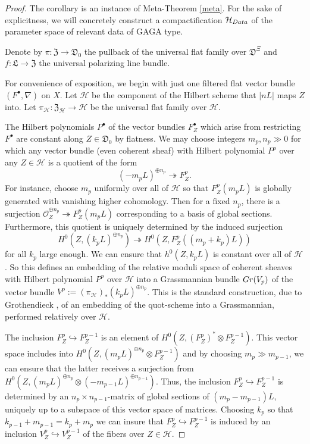 \documentclass[10pt,letterpaper,english,reqno]{amsart}
\numberwithin{equation}{subsection}
\newcommand\cH{{\mathcal H}}
\newcommand\cO{{\mathcal O}}
\newcommand\fD{{\mathfrak D}}
\newcommand\fL{{\mathfrak L}}
\newcommand\fZ{{\mathfrak Z}}
\newcommand\onto{\twoheadrightarrow}
\newcommand\into{\hookrightarrow}
\theoremstyle{definition}
\begin{document}
\begin{proof}
The corollary is an instance
of Meta-Theorem \ref{meta}.
For the sake of explicitness, we will
concretely construct a compactification
$\cH_{\rm Data}$ of the parameter space
of relevant data of GAGA type.

Denote by $\pi:\fZ\rightarrow \fD_0$ 
the pullback of the universal flat 
family over $\fD^\Xi$ and 
$f:\fL\rightarrow \fZ$ the universal 
polarizing line bundle.  

For convenience of exposition,
we begin with just one filtered flat vector bundle
$(F^\bullet, \nabla)$ on $X$.
Let $\cH$ be the component of the Hilbert scheme that
$|nL|$ maps $Z$ into. Let 
$\pi_\cH\colon \fZ_\cH\to \cH$ be the universal
flat family over $\cH$.

The Hilbert polynomials
$P^\bullet$ of the vector bundles $F^\bullet_Z$
which arise from restricting $F^\bullet$ 
are constant along $Z\in \fD_0$ by flatness. 
We may choose
integers $m_p, n_p \gg 0$ for which any vector
bundle (even coherent sheaf)
with Hilbert polynomial $P^p$ over 
any $Z\in \cH$
is a quotient of the form $$(-m_pL)^{\oplus n_p}\onto F^p_Z.$$
For instance, choose $m_p$
uniformly over all of $\cH$ so that $F_Z^p(m_pL)$
is globally generated with vanishing higher cohomology.
Then for a fixed $n_p$, there is a surjection
$\cO_Z^{\oplus n_p}\onto F^p_Z(m_pL)$ 
corresponding to a basis of global sections.
Furthermore, this quotient is uniquely determined by the
induced surjection  $$H^0(Z, (k_pL)^{\oplus n_p})\onto 
H^0(Z, F_Z^p((m_p+k_p)L))$$ for all $k_p$ large enough.
We can ensure that $h^0(Z,k_pL)$ is constant over all of $\cH$.
So this defines an embedding of the relative moduli
space of coherent sheaves with Hilbert polynomial $P^p$ over $\cH$
into a Grassmannian bundle ${\rm Gr}(V_p)$ of the vector bundle
$V^p:=(\pi_\cH)_*(k_pL)^{\oplus n_p}$. This is the standard 
construction, due to Grothendieck \cite{grothendieck-fga-iv}, 
of an embedding of the quot-scheme into a Grassmannian,
performed relatively over $\cH$.

The inclusion $F^p_Z\hookrightarrow F^{p-1}_Z$ is an element of
$H^0(Z, (F_Z^p)^*\otimes F_Z^{p-1})$. This vector space
includes into $H^0(Z, (m_pL)^{\oplus n_p}\otimes F_Z^{p-1})$
and by choosing $m_p\gg m_{p-1}$, we can ensure that the latter
receives a surjection from $H^0(Z,(m_pL)^{\oplus n_p}\otimes (-m_{p-1}L)^{\oplus n_{p-1}}).$ Thus, the inclusion $F_Z^p\hookrightarrow F_Z^{p-1}$
is determined by an $n_p\times n_{p-1}$-matrix of
global sections of $(m_p-m_{p-1})L$, uniquely up to
a subspace of this vector space of matrices.
Choosing $k_p$ so that $k_{p-1}+m_{p-1} = k_p + m_p$ we can insure that
$F_Z^p\into F_Z^{p-1}$ is induced by an inclusion 
$V_{Z}^p\into V_{Z}^{p-1}$ of the fibers over $Z\in \cH$.



\end{proof}
\end{document}
